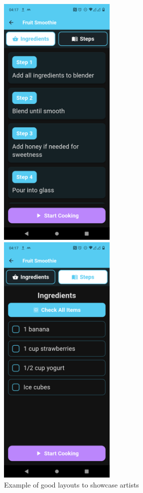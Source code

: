\documentclass[]{project_final}
\begin{document}
\begin{figure}[ht!]
  \centering
  \begin{minipage}[t]{0.4\textwidth}
    \includegraphics[width=0.5\textwidth]{presteps.png}
  \end{minipage}
  \hfill
  \begin{minipage}[t]{0.4\textwidth}
    \includegraphics[width=0.5\textwidth]{preingredients.png}
  \end{minipage}
  \caption{Example of good layouts to showcase artists}
  \label{fig:1}
\end{figure}
\end{document}
